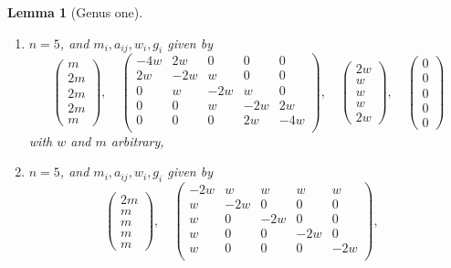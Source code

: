 \documentclass{stacks-project}
\theoremstyle{plain}
\newtheorem{lemma}[subsection]{Lemma}
\theoremstyle{definition}
\theoremstyle{remark}
\numberwithin{equation}{subsection}
\begin{document}
\begin{lemma}[Genus one]
\begin{enumerate}
$$\begin{matrix}
0 \\
0 \\
0
\end{matrix}
\right)
$$
with $w$ and $m$ arbitrary,
\item
\label{item-down-equal-equal-up}
$n = 5$, and $m_i, a_{ij}, w_i, g_i$ given by
$$
\left(
\begin{matrix}
m \\
2m \\
2m \\
2m \\
m
\end{matrix}
\right),
\quad
\left(
\begin{matrix}
-4w & 2w & 0 & 0 & 0 \\
2w & -2w & w & 0 & 0 \\
0 & w & -2w & w & 0 \\
0 & 0 & w & -2w & 2w \\
0 & 0 & 0 & 2w & -4w \\
\end{matrix}
\right),
\quad
\left(
\begin{matrix}
2w \\
w \\
w \\
w \\
2w
\end{matrix}
\right),
\quad
\left(
\begin{matrix}
0 \\
0 \\
0 \\
0 \\
0
\end{matrix}
\right)
$$
with $w$ and $m$ arbitrary,
\item
\label{item-quadruple}
$n = 5$, and $m_i, a_{ij}, w_i, g_i$ given by
$$
\left(
\begin{matrix}
2m \\
m \\
m \\
m \\
m
\end{matrix}
\right),
\quad
\left(
\begin{matrix}
-2w & w & w & w & w \\
w & -2w & 0 & 0 & 0 \\
w & 0 & -2w & 0 & 0 \\
w & 0 & 0 & -2w & 0 \\
w & 0 & 0 & 0 & -2w \\
\end{matrix}
\right),
\quad
$$
\end{enumerate}
\end{lemma}
\end{document}
